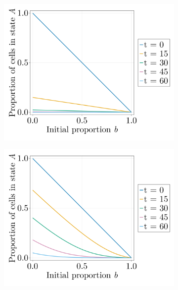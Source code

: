 \begin{figure}[ht]
\begin{subfigure}{0.4\textwidth}
    \end{subfigure}
    \\
    \begin{subfigure}{0.4\textwidth}
        \centering
        \includegraphics[width=\textwidth]{figures/407/407-phia-vs-b-solution-constant.png}
    \end{subfigure}
    \hspace{5em}
    \begin{subfigure}{0.4\textwidth}
        \centering
        \includegraphics[width=\textwidth]{figures/407/407-phia-vs-b-solution-meanfield.png}

\end{subfigure}
\end{figure}
